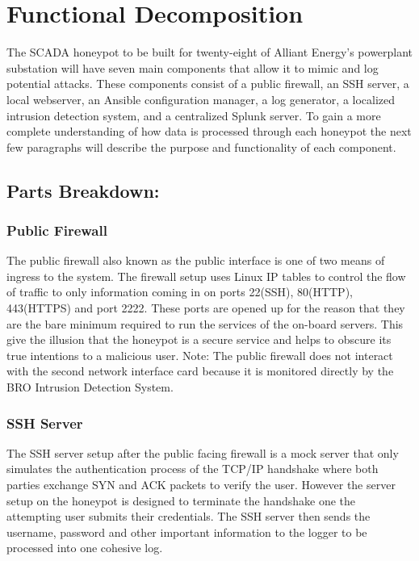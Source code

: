 \section{Functional Decomposition}

The SCADA honeypot to be built for twenty-eight of Alliant Energy's powerplant substation will have seven main components that allow it to mimic and log potential attacks.  These components consist of a public firewall, an SSH server, a local webserver, an Ansible configuration manager, a log generator, a localized intrusion detection system, and a centralized Splunk server.  To gain a more complete understanding of how data is processed through each honeypot the next few paragraphs will describe the purpose and functionality of each component.

\subsection{Parts Breakdown:}

\subsubsection{Public Firewall}
The public firewall also known as the public interface is one of two means of ingress to the system.  The firewall setup uses Linux IP tables to control the flow of traffic to only information coming in on ports 22(SSH), 80(HTTP), 443(HTTPS) and port 2222.  These ports are opened up for the reason that they are the bare minimum required to run the services of the on-board servers.  This give the illusion that the honeypot is a secure service and helps to obscure its true intentions to a malicious user.  Note: The public firewall does not interact with the second network interface card because it is monitored directly by the BRO Intrusion Detection System.

\subsubsection{SSH Server}
The SSH server setup after the public facing firewall is a mock server that only simulates the authentication process of the TCP/IP handshake where both parties exchange SYN and ACK packets to verify the user.  However the server setup on the honeypot is designed to terminate the handshake one the attempting user submits their credentials.  The SSH server then sends the username, password and other important information to the logger to be processed into one cohesive log.

